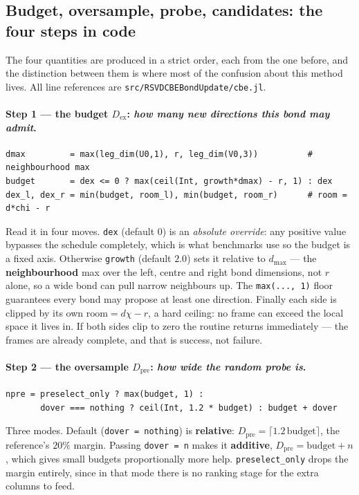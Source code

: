 \documentclass[11pt,a4paper]{article}
\newcommand{\Dex}{D_{\mathrm{ex}}}
\newcommand{\Dpre}{D_{\mathrm{pre}}}
\newcommand{\code}[1]{\texttt{\small #1}}
\newcommand{\file}[1]{\texttt{\small #1}}
\begin{document}
\subsection{Budget, oversample, probe, candidates: the four steps in code}
\label{sec:fourfunnel}

The four quantities are produced in a strict order, each from the one before, and the
distinction between them is where most of the confusion about this method lives. All line
references are \file{src/RSVDCBEBondUpdate/cbe.jl}.

\paragraph{Step 1 --- the budget $\Dex$: \emph{how many new directions this bond may admit}.}
\begin{lstlisting}[style=jl]
dmax         = max(leg_dim(U0,1), r, leg_dim(V0,3))          # neighbourhood max
budget       = dex <= 0 ? max(ceil(Int, growth*dmax) - r, 1) : dex
dex_l, dex_r = min(budget, room_l), min(budget, room_r)      # room = d*chi - r
\end{lstlisting}
Read it in four moves. \code{dex} (default $0$) is an \emph{absolute override}: any positive
value bypasses the schedule completely, which is what benchmarks use so the budget is a fixed
axis. Otherwise \code{growth} (default $2.0$) sets it relative to $d_{\max}$ --- the
\textbf{neighbourhood} max over the left, centre and right bond dimensions, not $r$ alone, so a
wide bond can pull narrow neighbours up. The \code{max(..., 1)} floor guarantees every bond may
propose at least one direction. Finally each side is clipped by its own
$\mathrm{room} = d\chi - r$, a hard ceiling: no frame can exceed the local space it lives in. If
both sides clip to zero the routine returns immediately --- the frames are already complete, and
that is success, not failure.

\paragraph{Step 2 --- the oversample $\Dpre$: \emph{how wide the random probe is}.}
\begin{lstlisting}[style=jl]
npre = preselect_only ? max(budget, 1) :
       dover === nothing ? ceil(Int, 1.2 * budget) : budget + dover
\end{lstlisting}
Three modes. Default (\code{dover = nothing}) is \textbf{relative}: $\Dpre = \lceil 1.2\,
\text{budget}\rceil$, the reference's $20\%$ margin. Passing \code{dover = n} makes it
\textbf{additive}, $\Dpre = \text{budget} + n$, which gives small budgets proportionally more
help. \code{preselect\_only} drops the margin entirely, since in that mode there is no ranking
stage for the extra columns to feed.
\end{document}
